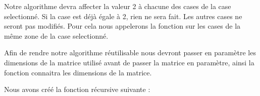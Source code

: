 Notre algorithme devra affecter la valeur 2 à chacune des cases de la case selectionné.
Si la case est déjà égale à 2, rien ne sera fait.
Les autres cases ne seront pas modifiés.
Pour cela nous appelerons la fonction sur les cases de la même zone de la case selectionné.

Afin de rendre notre algorithme réutilisable nous devront passer en paramètre les dimensions de la matrice utilisé avant de passer la matrice en paramètre, ainsi la fonction connaitra les dimensions de la matrice.

Nous avons créé la fonction récursive suivante :

\inputminted[linenos,firstline=8, lastline=25]{cpp}{../cpp/TP1-2/bubbleBreaker.c}
